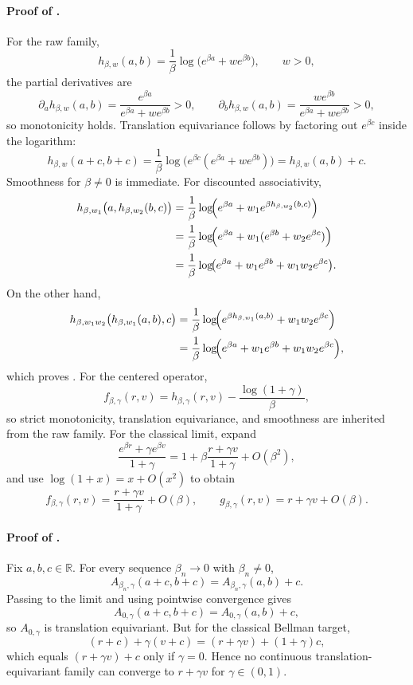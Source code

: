\documentclass{article}
\theoremstyle{remark}
\newcommand{\R}{\mathbb{R}}
\begin{document}
\paragraph{Proof of .}
For the raw family,
\[
 h_{\beta,w}(a,b)=\frac{1}{\beta}\log\!\bigl(e^{\beta a}+w e^{\beta b}\bigr),
\qquad w>0,
\]
the partial derivatives are
\[
\partial_a h_{\beta,w}(a,b)=\frac{e^{\beta a}}{e^{\beta a}+w e^{\beta b}}>0,
\qquad
\partial_b h_{\beta,w}(a,b)=\frac{w e^{\beta b}}{e^{\beta a}+w e^{\beta b}}>0,
\]
so monotonicity holds.
Translation equivariance follows by factoring out $e^{\beta c}$ inside the logarithm:
\[
 h_{\beta,w}(a+c,b+c)=\frac{1}{\beta}\log\!\bigl(e^{\beta c}(e^{\beta a}+w e^{\beta b})\bigr)=h_{\beta,w}(a,b)+c.
\]
Smoothness for $\beta\neq 0$ is immediate.
For discounted associativity,
\begin{align*}
 h_{\beta,w_1}\bigl(a,h_{\beta,w_2}(b,c)\bigr)
 &= \frac{1}{\beta}\log\!\Bigl(e^{\beta a}+w_1 e^{\beta h_{\beta,w_2}(b,c)}\Bigr)\\
 &= \frac{1}{\beta}\log\!\Bigl(e^{\beta a}+w_1(e^{\beta b}+w_2 e^{\beta c})\Bigr)\\
 &= \frac{1}{\beta}\log\!\bigl(e^{\beta a}+w_1 e^{\beta b}+w_1w_2 e^{\beta c}\bigr).
\end{align*}
On the other hand,
\begin{align*}
 h_{\beta,w_1w_2}\bigl(h_{\beta,w_1}(a,b),c\bigr)
 &= \frac{1}{\beta}\log\!\Bigl(e^{\beta h_{\beta,w_1}(a,b)}+w_1w_2 e^{\beta c}\Bigr)\\
 &= \frac{1}{\beta}\log\!\Bigl(e^{\beta a}+w_1 e^{\beta b}+w_1w_2 e^{\beta c}\Bigr),
\end{align*}
which proves .
For the centered operator,
\[
 f_{\beta,\gamma}(r,v)=h_{\beta,\gamma}(r,v)-\frac{\log(1+\gamma)}{\beta},
\]
so strict monotonicity, translation equivariance, and smoothness are inherited from the raw family.
For the classical limit, expand
\[
\frac{e^{\beta r}+\gamma e^{\beta v}}{1+\gamma}
=1+\beta\frac{r+\gamma v}{1+\gamma}+O(\beta^2),
\]
and use $\log(1+x)=x+O(x^2)$ to obtain
\[
 f_{\beta,\gamma}(r,v)=\frac{r+\gamma v}{1+\gamma}+O(\beta),
\qquad
 g_{\beta,\gamma}(r,v)=r+\gamma v+O(\beta).
\]

\paragraph{Proof of .}
Fix $a,b,c\in\R$. For every sequence $\beta_n\to 0$ with $\beta_n\neq 0$,
\[
A_{\beta_n,\gamma}(a+c,b+c)=A_{\beta_n,\gamma}(a,b)+c.
\]
Passing to the limit and using pointwise convergence gives
\[
A_{0,\gamma}(a+c,b+c)=A_{0,\gamma}(a,b)+c,
\]
so $A_{0,\gamma}$ is translation equivariant. But for the classical Bellman target,
\[
(r+c)+\gamma(v+c)=(r+\gamma v)+(1+\gamma)c,
\]
which equals $(r+\gamma v)+c$ only if $\gamma=0$. Hence no continuous translation-equivariant family can converge to $r+\gamma v$ for $\gamma\in(0,1)$.
\end{document}
